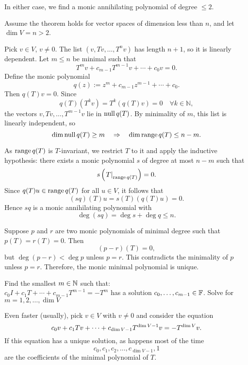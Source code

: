 \begin{prf}
  In either case, we find a monic annihilating polynomial of degree $\leq 2$.

   Assume the theorem holds for vector spaces of dimension less than $n$, and let $\dim V = n > 2$.

  Pick $v \in V$, $v \ne 0$. The list $(v, Tv, \dots, T^n v)$ has length $n+1$, so it is linearly dependent. Let $m \leq n$ be minimal such that
  \[
  T^m v + c_{m-1} T^{m-1}v + \cdots + c_0 v = 0.
  \]
  Define the monic polynomial
  \[
  q(z) := z^m + c_{m-1} z^{m-1} + \cdots + c_0.
  \]
  Then $q(T)v = 0$. Since
  \[
  q(T)(T^k v) = T^k(q(T)v) = 0 \quad \forall k \in \mathbb{N},
  \]
  the vectors $v, Tv, \dots, T^{m-1}v$ lie in $\operatorname{null} q(T)$. By minimality of $m$, this list is linearly independent, so
  \[
  \dim \operatorname{null} q(T) \geq m \quad \Rightarrow \quad \dim \operatorname{range} q(T) \leq n - m.
  \]

  As $\operatorname{range} q(T)$ is $T$-invariant, we restrict $T$ to it and apply the inductive hypothesis: there exists a monic polynomial $s$ of degree at most $n - m$ such that
  \[
  s\left( \left. T \right|_{\operatorname{range} q(T)} \right) = 0.
  \]
  Since $q(T)u \in \operatorname{range} q(T)$ for all $u \in V$, it follows that
  \[
  (sq)(T)u = s(T)(q(T)u) = 0.
  \]
  Hence $sq$ is a monic annihilating polynomial with
  \[
  \deg(sq) = \deg s + \deg q \leq n.
  \]

   Suppose $p$ and $r$ are two monic polynomials of minimal degree such that $p(T) = r(T) = 0$. Then
  \[
  (p - r)(T) = 0,
  \]
  but $\deg(p - r) < \deg p$ unless $p = r$. This contradicts the minimality of $p$ unless $p = r$. Therefore, the monic minimal polynomial is unique.
\end{prf}



\setcounter{thm}{23}

 Find the smallest $m \in \mathbb{N}$ such that: \\
$c_0I + c_1 T + \cdots + c_{m-1} T^{m-1} = -T^{m}$ has a solution $c_0, \dots, c_{m-1} \in \mathbb{F}$. Solve for $m=1,2,\dots,\dim V$

Even faster (usually), pick $v \in V$ with $v \neq 0$ and consider the equation
\begin{equation}
  c_0v + c_1Tv + \cdots + c_{\operatorname{dim} V-1}T^{\operatorname{dim} V-1}v=-T^{\operatorname{dim} V}v.
\end{equation}
If this equation has a unique solution, as happens most of the time
\begin{equation}
  c_0, c_1, c_2, \dots, c_{\dim V-1}, 1
\end{equation}
are the coefficients of the minimal polynomial of $T$.

